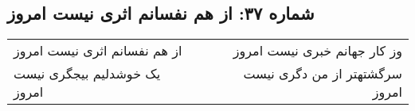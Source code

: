 \begin{center}
\section*{شماره ۳۷: از هم نفسانم اثری نیست امروز}
\label{sec:037}
\begin{longtable}{l p{0.5cm} r}
از هم نفسانم اثری نیست امروز
&&
وز کار جهانم خبری نیست امروز
\\
یک خوشدلیم بیجگری نیست امروز
&&
سرگشتهتر از من دگری نیست امروز
\\
\end{longtable}
\end{center}
